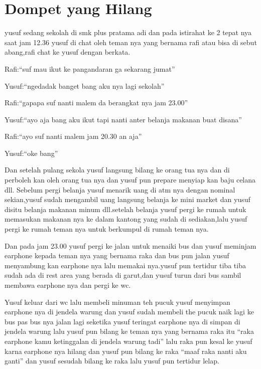 \chapter*{Dompet yang Hilang}


 yusuf sedang sekolah di smk plus pratama adi dan pada istirahat ke 2 tepat nya saat jam 12.36 yusuf di chat oleh teman nya yang bernama rafi atau bisa di sebut abang,rafi chat ke yusuf dengan berkata.


Rafi:``suf mau ikut ke pangandaran ga sekarang jumat''


Yusuf:``ngedadak banget bang aku nya lagi sekolah''


Rafi:``gapapa suf nanti malem da berangkat nya jam 23.00''


Yusuf:``ayo aja bang aku ikut tapi nanti anter belanja makanan buat disana''


Rafi:``ayo suf nanti malem jam 20.30 an aja''


Yusuf:``oke bang''


Dan setelah pulang sekola yusuf langsung bilang ke orang tua  nya dan di perboleh kan oleh orang tua nya dan yusuf pun prepare menyiap kan baju celana dll. Sebelum pergi belanja yusuf menarik uang di atm nya dengan nominal sekian,yusuf sudah mengambil uang langsung belanja ke mini market dan yusuf disitu belanja makanan minum dll.setelah belanja yusuf pergi ke rumah untuk memasukan makanan nya ke dalam kantong yang sudah di sediakan,lalu yusuf pergi ke rumah teman nya untuk berkumpul di rumah teman nya.


Dan pada jam 23.00 yusuf pergi ke jalan untuk menaiki bus dan yusuf meminjam earphone kepada teman nya yang bernama raka dan bus pun jalan yusuf menyambung kan earphone nya lalu memakai nya.yusuf pun tertidur tiba tiba sudah ada  di rest area yang berada di garut,dan yusuf turun dari bus sambil membawa earphone nya dan pergi ke wc.


Yusuf keluar dari wc lalu membeli minuman teh pucuk yusuf menyimpan earphone nya di jendela warung dan yusuf sudah membeli the pucuk naik lagi ke bus pas bus nya jalan lagi seketika yusuf teringat earphone nya di simpan di jendela warung lalu yusuf pun bilang ke teman nya yang bernama raka itu “raka earphone kamu ketinggalan di jendela warung tadi” lalu raka pun kesal ke yusuf karna earphone nya hilang  dan yusuf pun bilang ke raka “maaf raka nanti aku ganti” dan yusuf sesudah bilang ke raka lalu yusuf pun tertidur lelap.


